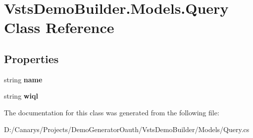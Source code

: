\hypertarget{class_vsts_demo_builder_1_1_models_1_1_query}{}\section{Vsts\+Demo\+Builder.\+Models.\+Query Class Reference}
\label{class_vsts_demo_builder_1_1_models_1_1_query}
\subsection*{Properties}
\begin{DoxyCompactItemize}
\item 
\mbox{\label{class_vsts_demo_builder_1_1_models_1_1_query_abd4490faed1729ff5da1c2ce44e687b2}} 
string {\bfseries name}
\item 
\mbox{\label{class_vsts_demo_builder_1_1_models_1_1_query_a29f040d61f1e22299d94f9ff3c67e1c4}} 
string {\bfseries wiql}
\end{DoxyCompactItemize}


The documentation for this class was generated from the following file\+:\begin{DoxyCompactItemize}
\item 
D\+:/\+Canarys/\+Projects/\+Demo\+Generator\+Oauth/\+Vsts\+Demo\+Builder/\+Models/Query.\+cs\end{DoxyCompactItemize}
